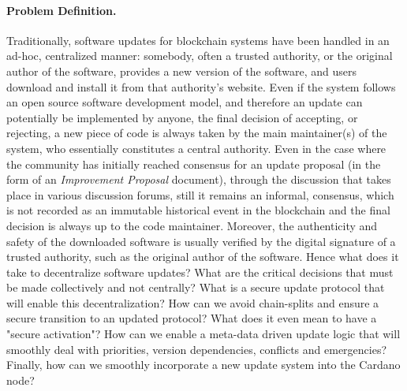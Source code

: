 

\paragraph{Problem Definition.}
Traditionally, software updates for blockchain systems have been handled in an ad-hoc, centralized manner: somebody, often a trusted authority, or the original author of the software, provides a new version of the software, and users
download and install it from that authority's website. Even if the system 
follows an open source software development model, and therefore an update can 
potentially be implemented by anyone, the final decision of accepting, or 
rejecting, a new piece of code is always taken by the main maintainer(s) of the 
system, who essentially constitutes a central authority. Even in the case where 
the community has initially reached consensus for an update proposal (in the 
form of an \emph{Improvement Proposal} document), through the discussion that 
takes place in various discussion forums, still it remains an informal, 
 consensus, which is not recorded as an immutable historical event 
in the blockchain and the final decision is always up to the code maintainer. 
Moreover, the authenticity and safety of the downloaded software is usually 
verified by the digital signature of a trusted authority, such as the original 
author of the software. Hence what does it take to decentralize software 
updates? What are the critical decisions that must be made collectively and not 
centrally? What is a secure update protocol that will enable this 
decentralization? How can we avoid chain-splits and ensure a secure transition 
to an updated protocol? What does it even mean to have a "secure activation"? 
How can we enable a meta-data driven update logic that will smoothly deal with 
priorities, version dependencies, conflicts and emergencies? Finally, how can 
we smoothly incorporate a new update system into the Cardano node?

